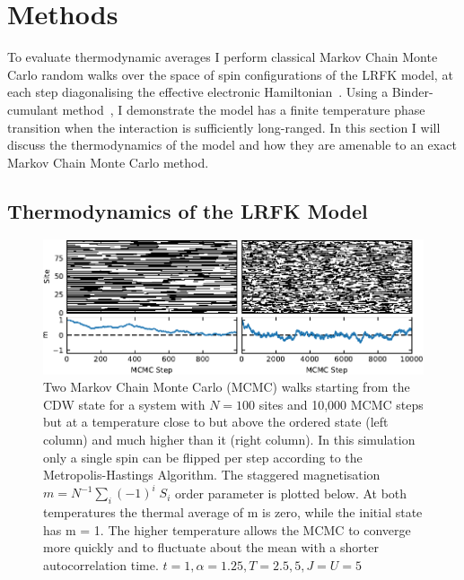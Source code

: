 \hypertarget{sec:lrfk-methods}{%
\section{Methods}\label{sec:lrfk-methods}}

To evaluate thermodynamic averages I perform classical Markov Chain Monte Carlo random walks over the space of spin configurations of the LRFK model, at each step diagonalising the effective electronic Hamiltonian~\autocite{maskaThermodynamicsTwodimensionalFalicovKimball2006}. Using a Binder-cumulant method~\autocite{binderFiniteSizeScaling1981,musialMonteCarloSimulations2002}, I demonstrate the model has a finite temperature phase transition when the interaction is sufficiently long-ranged. In this section I will discuss the thermodynamics of the model and how they are amenable to an exact Markov Chain Monte Carlo method.

\hypertarget{thermodynamics-of-the-lrfk-model}{%
\subsection{Thermodynamics of the LRFK Model}\label{thermodynamics-of-the-lrfk-model}}

\hypertarget{fig:raw_steps_single_flip}{%
\begin{figure}
\centering
\includegraphics[width=1\textwidth,height=\textheight]{figure_code/fk_chapter/lsr/pdf_figs/raw_steps_single_flip}
\caption[{Comparison of different proposal distributions}]{Two Markov Chain Monte Carlo (MCMC) walks starting from the CDW state for a system with \(N = 100\) sites and 10,000 MCMC steps but at a temperature close to but above the ordered state (left column) and much higher than it (right column). In this simulation only a single spin can be flipped per step according to the Metropolis-Hastings Algorithm. The staggered magnetisation \(m = N^{-1} \sum_i (-1)^i \; S_i\) order parameter is plotted below. At both temperatures the thermal average of m is zero, while the initial state has m = 1. The higher temperature allows the MCMC to converge more quickly and to fluctuate about the mean with a shorter autocorrelation time. \(t = 1, \alpha = 1.25, T = {2.5,5}, J = U = 5\)}
\label{fig:raw_steps_single_flip}
\end{figure}
}

